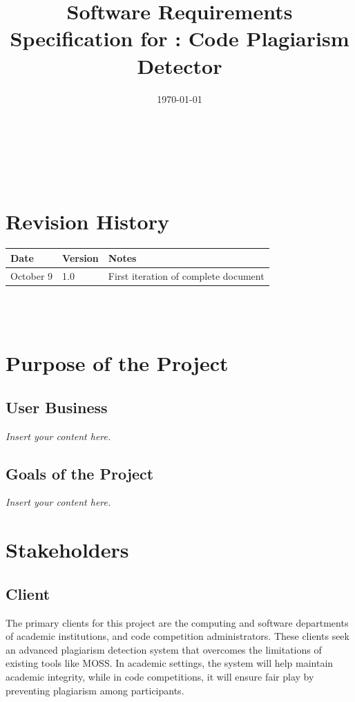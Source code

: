\documentclass[12pt]{article}
\newcommand{\lips}{\textit{Insert your content here.}}
\begin{document}
\title{Software Requirements Specification for \progname: Code Plagiarism Detector} 
\author{\authname}
\date{\today}
	
\maketitle

~\newpage


\tableofcontents

~\newpage

\section*{Revision History}

\begin{tabularx}{\textwidth}{p{3cm}p{2cm}X}
\toprule {\textbf{Date}} & {\textbf{Version}} & {\textbf{Notes}}\\
\midrule
October 9 & 1.0 & First iteration of complete document\\
\bottomrule
\end{tabularx}

~\\

~\newpage
\section{Purpose of the Project}
\subsection{User Business}
\lips
\subsection{Goals of the Project}
\lips

\section{Stakeholders}

\subsection{Client}
The primary clients for this project are the computing and software departments
of academic institutions, and code competition administrators. These clients
seek an advanced plagiarism detection system that overcomes the limitations of
existing tools like MOSS. In academic settings, the system will help maintain
academic integrity, while in code competitions, it will ensure fair play by
preventing plagiarism among participants.
\end{document}
